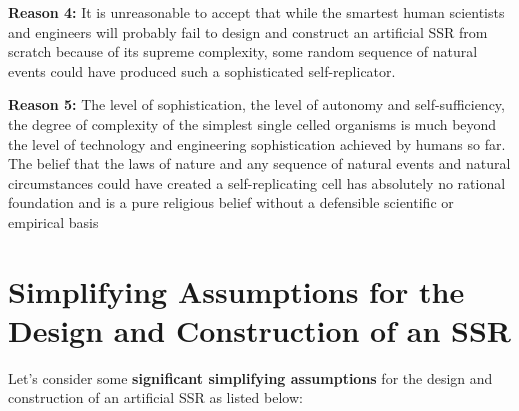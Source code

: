 \textbf{Reason 4:} It is unreasonable to accept that while the smartest
human scientists and engineers will probably fail to design and
construct an artificial SSR from scratch because of its supreme
complexity, some random sequence of natural events could have produced
such a sophisticated self-replicator.

\textbf{Reason 5:} The level of sophistication, the level of autonomy
and self-sufficiency, the degree of complexity of the simplest single
celled organisms is much beyond the level of technology and engineering
sophistication achieved by humans so far. The belief that the laws of
nature and any sequence of natural events and natural circumstances
could have created a self-replicating cell has absolutely no rational
foundation and is a pure religious belief without a defensible
scientific or empirical basis

\section[Simplifying Assumptions]{Simplifying Assumptions for the Design and Construction of an SSR}

Let’s consider some \textbf{significant simplifying assumptions} for the
design and construction of an artificial SSR as listed below:

